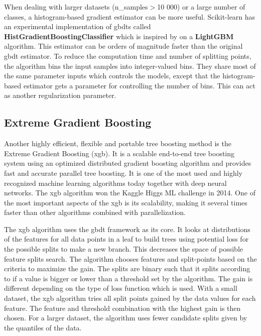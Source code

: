 \documentclass[a4paper, american, 12pt]{report}
\begin{document}
	When dealing with larger datasets (n\_samples$>$10 000) or a large number of classes, a histogram-based gradient estimator can be more useful. Scikit-learn has an experimental implementation of \acrshort{gbdt}s called \textbf{HistGradientBoostingClassifier} which is inspired by \citet{lightgbm} on a \textbf{LightGBM} algorithm. This estimator can be orders of magnitude faster than the original \acrshort{gbdt} estimator. To reduce the computation time and number of splitting points, the algorithm bins the input samples into integer-valued bins. They share most of the same parameter inputs which controls the models, except that the histogram-based estimator gets a parameter for controlling the number of bins. This can act as another regularization parameter. 
	
	
	\subsection{Extreme Gradient Boosting}
	\label{subsect:Theory-XGB}
	Another highly efficient, flexible and portable tree boosting method is the Extreme Gradient Boosting (\acrshort{xgb})\cite{xgboost}. It is a scalable end-to-end tree boosting system using an optimized distributed gradient boosting algorithm and provides fast and accurate parallel tree boosting. It is one of the most used and highly recognized machine learning algorithms today together with deep neural networks. The \acrshort{xgb} algorithm won the Kaggle Higgs ML challenge in 2014\cite{MLHiggs}. One of the most important aspects of the \acrshort{xgb} is its scalability, making it several times faster than other algorithms combined with parallelization. 
	
	The \acrshort{xgb} algorithm uses the \acrshort{gbdt} framework as its core. It looks at distributions of the features for all data points in a leaf to build trees using potential loss for the possible splits to make a new branch. This decreases the space of possible feature splits search. The algorithm chooses features and split-points based on the criteria to maximize the gain. The splits are binary such that it splits according to if a value is bigger or lower than a threshold set by the algorithm. The gain is different depending on the type of loss function which is used. With a small dataset, the \acrshort{xgb} algorithm tries all split points gained by the data values for each feature. The feature and threshold combination with the highest gain is then chosen. For a larger dataset, the algorithm uses fewer candidate splits given by the quantiles of the data. 
	
\end{document}
